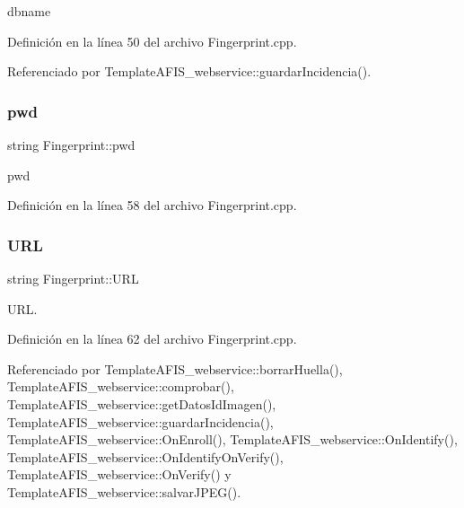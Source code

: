 dbname 



Definición en la línea 50 del archivo Fingerprint.\+cpp.



Referenciado por Template\+A\+F\+I\+S\+\_\+webservice\+::guardar\+Incidencia().

\hypertarget{classFingerprint_a1e4d2c44581328219f378933b30c9828}{}\label{classFingerprint_a1e4d2c44581328219f378933b30c9828} 
\subsubsection{\texorpdfstring{pwd}{pwd}}
{\footnotesize\ttfamily string Fingerprint\+::pwd}



pwd 



Definición en la línea 58 del archivo Fingerprint.\+cpp.

\hypertarget{classFingerprint_a3e3626c36b44fa9d7d522196e2d121ff}{}\label{classFingerprint_a3e3626c36b44fa9d7d522196e2d121ff} 
\subsubsection{\texorpdfstring{U\+RL}{URL}}
{\footnotesize\ttfamily string Fingerprint\+::\+U\+RL}



U\+RL. 



Definición en la línea 62 del archivo Fingerprint.\+cpp.



Referenciado por Template\+A\+F\+I\+S\+\_\+webservice\+::borrar\+Huella(), Template\+A\+F\+I\+S\+\_\+webservice\+::comprobar(), Template\+A\+F\+I\+S\+\_\+webservice\+::get\+Datos\+Id\+Imagen(), Template\+A\+F\+I\+S\+\_\+webservice\+::guardar\+Incidencia(), Template\+A\+F\+I\+S\+\_\+webservice\+::\+On\+Enroll(), Template\+A\+F\+I\+S\+\_\+webservice\+::\+On\+Identify(), Template\+A\+F\+I\+S\+\_\+webservice\+::\+On\+Identify\+On\+Verify(), Template\+A\+F\+I\+S\+\_\+webservice\+::\+On\+Verify() y Template\+A\+F\+I\+S\+\_\+webservice\+::salvar\+J\+P\+E\+G().

\hypertarget{classFingerprint_a23d9e08e3e34d64fcf0771a1c2590a4e}{}\label{classFingerprint_a23d9e08e3e34d64fcf0771a1c2590a4e} 
